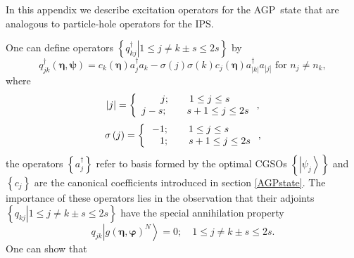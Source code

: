 \documentclass[aps,preprint]{revtex4}%
\begin{document}
In this appendix we describe excitation operators for the AGP\ state that are
analogous to particle-hole operators for the IPS.

One can define operators $\left\{  \left.  q_{kj}^{\dagger}\right\vert 1\leq
j\neq k\pm s\leq2s\right\}  $ by
\begin{equation}
q_{jk}^{\dagger}\left(  \mathbf{\eta,\psi}\right)  =c_{k}\left(  \mathbf{\eta
}\right)  a_{j}^{\dagger}a_{k}-\sigma\left(  j\right)  \sigma\left(  k\right)
c_{j}\left(  \mathbf{\eta}\right)  a_{\left\vert k\right\vert }^{\dagger
}a_{\left\vert j\right\vert }\text{ for }n_{j}\neq n_{k},
\end{equation}
where%
\begin{equation}
\left\vert j\right\vert =\left\{
\begin{array}
[c]{c}%
j;\qquad1\leq j\leq s\\
j-s;\qquad s+1\leq j\leq2s
\end{array}
\right.  ,
\end{equation}%
\begin{equation}
\sigma\left(  j\right)  =\left\{
\begin{array}
[c]{c}%
-1;\qquad1\leq j\leq s\quad\quad\\
\quad1;\qquad s+1\leq j\leq2s
\end{array}
\right.  ,
\end{equation}
the operators $\left\{  a_{j}^{\dagger}\right\}  $ refer to basis formed by
the optimal CGSOs $\left\{  \left\vert \psi_{j}\right\rangle \right\}  $ and
$\left\{  c_{j}\right\}  $ are the canonical coefficients introduced in
section \ref{AGPstate}. The importance of these operators lies in the
observation that their adjoints $\left\{  \left.  q_{kj}\right\vert 1\leq
j\neq k\pm s\leq2s\right\}  $ have the special annihilation property%
\begin{equation}
q_{jk}\left\vert g\left(  \mathbf{\eta},\mathbf{\varphi}\right)
^{N}\right\rangle =0;\quad1\leq j\neq k\pm s\leq2s.
\end{equation}
One can show \cite{Goscinski82a} that
\end{document}
